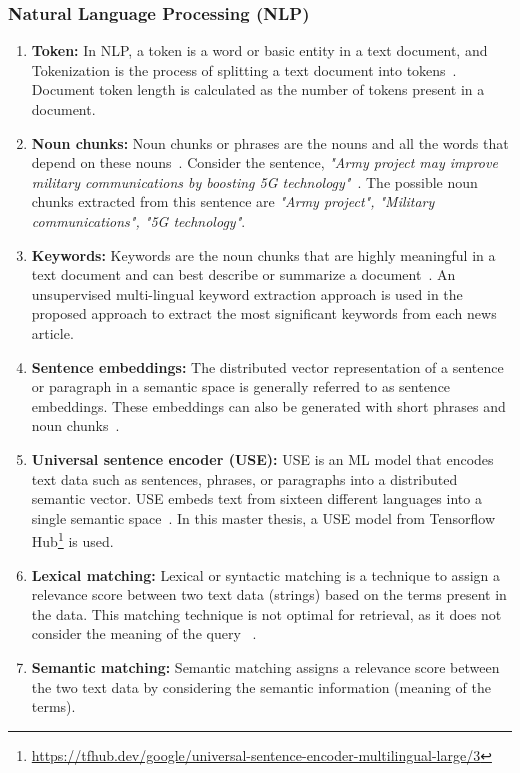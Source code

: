 \documentclass[master,proposal,extern,palatino]{rgseThesis}
\begin{document}
\subsubsection{Natural Language Processing (NLP)}

\begin{enumerate}
	
	\item{\textbf{Token:}} In NLP, a token is a word or basic entity in a text document, and Tokenization is the
	process of splitting a text document into tokens~\cite{webster1992tokenization}. Document token length is calculated as the number of tokens present in a document.
	
	\item{\textbf{Noun chunks:}} Noun chunks or phrases are the nouns and all the words that depend on these nouns~\cite{noun_chunk}. Consider the sentence, \textit{"Army project may improve military communications by boosting 5G technology"}~\cite{sample_news_article}. The possible noun chunks extracted from this sentence are \textit{"Army project", "Military communications", "5G technology"}.
	
	\item{\textbf{Keywords:}} Keywords are the noun chunks that are highly meaningful in a text document and can best describe or summarize a document~\cite{beliga2014keyword}. An unsupervised multi-lingual keyword extraction approach is used in the proposed approach to extract the most significant keywords from each news article.
	
	\item{\textbf{Sentence embeddings:}} The distributed vector representation of a sentence or paragraph
	in a semantic space is generally referred to as sentence embeddings. These embeddings can
	also be generated with short phrases and noun chunks~\cite{cer2018universal, yang2019multilingual}.
	
	\item{\textbf{Universal sentence encoder (USE):}} USE is an ML model that encodes text data such as
	sentences, phrases, or paragraphs into a distributed semantic vector. USE embeds text from
	sixteen different languages into a single semantic space~\cite{cer2018universal, yang2019multilingual}. In this master thesis, a USE model from Tensorflow Hub\footnote{\url{https://tfhub.dev/google/universal-sentence-encoder-multilingual-large/3}} is used. 
	
	\item{\textbf{Lexical matching:}} Lexical or syntactic matching is a technique to assign a relevance score between two text data (strings) based on the terms present in the data. This matching technique is not optimal for retrieval, as it does not consider the meaning of the query  ~\cite{kuzi2020leveraging}.
	
	\item{\textbf{Semantic matching:}} Semantic matching assigns a relevance score between the two text
	data by considering the semantic information (meaning of the terms).

\end{enumerate}	
\end{document}
